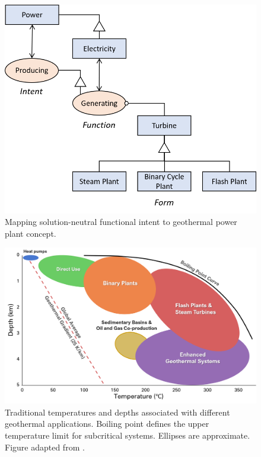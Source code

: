 \begin{figure}%
\centering
\includegraphics[width=.55\linewidth]{templates/images/Figure-PowerProduction-SolutionNeutral.png}
\singlespacing
\caption[Intent to concept for geothermal power plants]{Mapping solution-neutral functional intent to geothermal power plant concept.}
\label{fig:solution_neutral}
\end{figure}

\begin{figure}
\centering
\includegraphics[width=\textwidth]{templates/images/Figure-Geothermal_Use_Moore2013.png}
\caption[Geothermal applications by temperature and depth]{Traditional temperatures and depths associated with different geothermal applications. Boiling point defines the upper temperature limit for subcritical systems. Ellipses are approximate. Figure adapted from \protect\citep{moore_more_2013}.}
\label{fig:geotherm_apps}
\end{figure}

